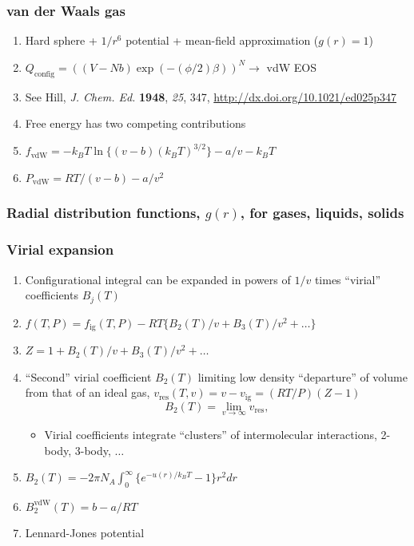 \documentclass[11pt]{article}
\begin{document}
\subsubsection{van der Waals gas}
\label{sec:org45d3228}
\begin{enumerate}
\item Hard sphere + \(1/r^6\) potential + mean-field approximation (\(g(r)=1\))
\item \(Q_\mathrm{config} = ((V-Nb) \exp (-(\phi/2)\beta))^N \rightarrow\) vdW EOS
\item See Hill, \emph{J. Chem. Ed.} \textbf{1948}, \emph{25}, 347, \url{http://dx.doi.org/10.1021/ed025p347}
\item Free energy has two competing contributions
\item \(f_\text{vdW} = - k_BT \ln \{ (v-b)(k_BT)^{3/2}\} -a/v -k_BT\)
\item \(P_\text{vdW}=RT/(v-b) - a/v^2\)
\end{enumerate}

\subsubsection{Radial distribution functions, \(g(r)\), for gases, liquids, solids}
\label{sec:org932b967}
\subsubsection{Virial expansion}
\label{sec:org7b0a46a}
\begin{enumerate}
\item Configurational integral can be expanded in powers of \(1/v\) times ``virial''
coefficients \(B_j(T)\)
\item \(f(T,P) = f_\text{ig}(T,P) - RT \{ B_2(T)/v + B_3(T)/v^2 + \ldots \}\)
\item \(Z = 1 + B_2(T)/v + B_3(T)/v^2 + \dots\)
\item ``Second'' virial coefficient \(B_2(T)\) limiting low density ``departure'' of
volume from that of an ideal gas, \(v_\text{res}(T,v) = v -
     v_\text{ig}=(RT/P)(Z-1)\)
	\[B_2(T) = \lim_{v \rightarrow \infty} v_\text{res}, \]
\begin{itemize}
\item Virial coefficients integrate ``clusters'' of intermolecular interactions, 2-body, 3-body, \(\ldots\)
\end{itemize}
\item \(B_2(T) = -2\pi N_A \int_0^\infty \{e^{-u(r)/k_BT}-1\}r^2dr\)
\item \(B_2^\text{vdW} (T) = b -a/RT\)
\item Lennard-Jones potential
\end{enumerate}
\end{document}
